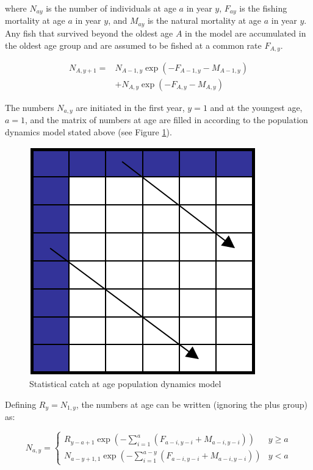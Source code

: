 \documentclass[
]{book}
\begin{document}
where \(N_{ay}\) is the number of individuals at age \(a\) in year \(y\), \(F_{ay}\) is the fishing mortality at age \(a\) in year \(y\), and \(M_{ay}\) is the natural mortality at age \(a\) in year \(y\). Any fish that survived beyond the oldest age \(A\) in the model are accumulated in the oldest age group and are assumed to be fished at a common rate \(F_{A,y}\).

\begin{align}
N_{A,y+1} = &N_{A-1,y} \exp \left( - F_{A-1,y} - M_{A-1,y} \right) \\
            &+ N_{A,y} \exp \left( - F_{A,y} - M_{A,y} \right)
\end{align}

The numbers \(N_{a,y}\) are initiated in the first year, \(y=1\) and at the youngest age, \(a=1\), and the matrix of numbers at age are filled in according to the population dynamics model stated above (see Figure \ref{fig:popdyn}).

\begin{figure}

{\centering \includegraphics[width=0.4\linewidth]{figure/sca_matrix} 

}

\caption{Statistical catch at age population dynamics model}\label{fig:popdyn}
\end{figure}

Defining \(R_y = N_{1,y}\), the numbers at age can be written (ignoring the plus group) as:

\begin{equation}
	N_{a,y} = \left\{ 
	\begin{matrix} 
		R_{y-a+1} \exp \left( - \sum^a_{i=1} \left( F_{a-i,y-i} + M_{a-i,y-i} \right) \right) & y \geq a \\
		N_{a-y+1,1} \exp \left( - \sum^{a-y}_{i=1} \left( F_{a-i,y-i} + M_{a-i,y-i} \right) \right) & y < a 
	\end{matrix} 
	\right.
\end{equation}
\end{document}
